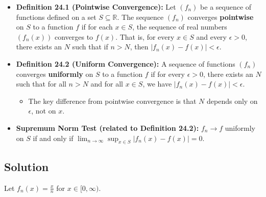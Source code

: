 \documentclass{article}
\newcommand{\R}{\mathbb{R}}
\begin{document}
\begin{itemize}
    \item \textbf{Definition 24.1 (Pointwise Convergence):} Let \((f_n)\) be a sequence of functions defined on a set \(S \subseteq \R\). The sequence \((f_n)\) converges \textbf{pointwise} on \(S\) to a function \(f\) if for each \(x \in S\), the sequence of real numbers \((f_n(x))\) converges to \(f(x)\). That is, for every \(x \in S\) and every \(\epsilon > 0\), there exists an \(N\) such that if \(n > N\), then \(|f_n(x) - f(x)| < \epsilon\).
    \item \textbf{Definition 24.2 (Uniform Convergence):} A sequence of functions \((f_n)\) converges \textbf{uniformly} on \(S\) to a function \(f\) if for every \(\epsilon > 0\), there exists an \(N\) such that for all \(n > N\) and for all \(x \in S\), we have \(|f_n(x) - f(x)| < \epsilon\).
        \begin{itemize}
            \item The key difference from pointwise convergence is that \(N\) depends only on \(\epsilon\), not on \(x\).
        \end{itemize}
    \item \textbf{Supremum Norm Test (related to Definition 24.2):} \(f_n \to f\) uniformly on \(S\) if and only if \(\lim_{n\to\infty} \sup_{x \in S} |f_n(x) - f(x)| = 0\).
\end{itemize}

\subsection*{Solution}

Let \(f_n(x) = \frac{x}{n}\) for \(x \in [0, \infty)\).
\end{document}

